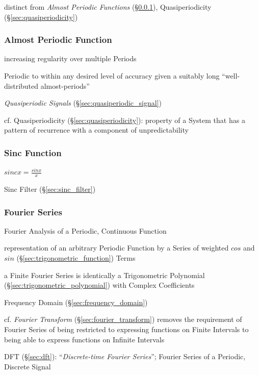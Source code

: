 \fist distinct from \emph{Almost Periodic Functions}
(\S\ref{sec:almost_periodic}), Quasiperiodicity (\S\ref{sec:quasiperiodicity})



\subsubsection{Almost Periodic Function}\label{sec:almost_periodic}

increasing regularity over multiple Periods

Periodic to within any desired level of accuracy given a suitably long
``well-distributed almost-periods''

\emph{Quasiperiodic Signals} (\S\ref{sec:quasiperiodic_signal})

cf. Quasiperiodicity (\S\ref{sec:quasiperiodicity}): property of a System that
has a pattern of recurrence with a component of unpredictability



\subsubsection{Sinc Function}\label{sec:sinc_function}

$sinc x = \frac{sin x}{x}$

Sinc Filter (\S\ref{sec:sinc_filter})



\subsubsection{Fourier Series}\label{sec:fourier_series}

Fourier Analysis of a Periodic, Continuous Function

representation of an arbitrary Periodic Function by a Series of weighted $cos$
and $sin$ (\S\ref{sec:trigonometric_function}) Terms

a Finite Fourier Series is identically a Trigonometric Polynomial
(\S\ref{sec:trigonometric_polynomial}) with Complex Coefficients

\fist Frequency Domain (\S\ref{sec:frequency_domain})

\fist cf. \emph{Fourier Transform} (\S\ref{sec:fourier_transform}) removes the
requirement of Fourier Series of being restricted to expressing functions on
Finite Intervals to being able to express functions on Infinite Intervals

DFT (\S\ref{sec:dft}): ``\emph{Discrete-time Fourier Series}''; Fourier Series
of a Periodic, Discrete Signal

